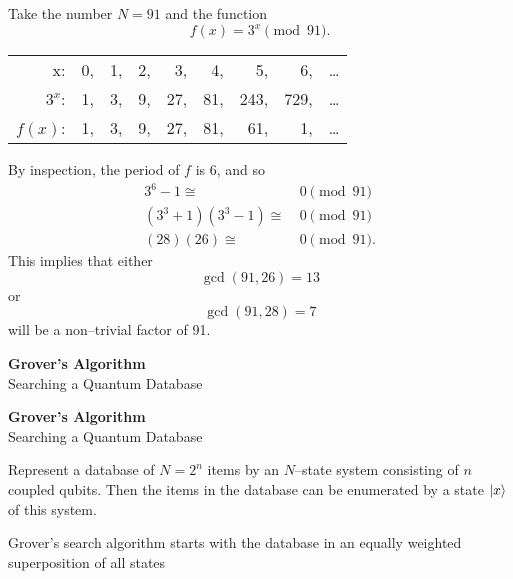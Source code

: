 \documentclass{slides}
\begin{document}
Take the number $N=91$ and the function
\begin{equation*}
f(x) = 3^x\pmod{91}.
\end{equation*}
\begin{flushleft}
\begin{tabular}{rrrrrrrrl}
x:& 0,& 1,& 2,& 3,& 4,& 5,& 6,& \dots\\
$3^x$:& 1,& 3,& 9,& 27,& 81,& 243,& 729,& \dots\\
$f(x)$:& 1,& 3,& 9,& 27,& 81,& 61,& 1,& \dots
\end{tabular}
\end{flushleft}
By inspection, the period of $f$ is 6, and so 
\begin{equation*}
\begin{split}
3^6- 1\cong&\ 0 \pmod{91}\\
\left(3^3+1\right)
\left(3^3-1\right)
\cong&\ 0 \pmod{91}\\
(28)(26)\cong&\ 0\pmod{91}.
\end{split}
\end{equation*}
This implies that either
\begin{equation*}
\gcd\left(91,26\right) = 13
\end{equation*}
or
\begin{equation*}
\gcd\left(91,28\right) = 7
\end{equation*}
will be a non--trivial factor of 91.


\pagebreak


\begin{center}
\textbf{Grover's Algorithm}\\
\bigskip
Searching a Quantum Database
\end{center}

\pagebreak

\begin{center}
\textbf{Grover's Algorithm}\\
\bigskip
Searching a Quantum Database
\end{center}

Represent a database of $N=2^n$ items by an $N$--state system
consisting of $n$ coupled qubits.  Then the items in the
database can be enumerated by a state ${|{x}\rangle}$ of this system.

Grover's search algorithm starts with the database in an
equally weighted superposition of all states
\end{document}
